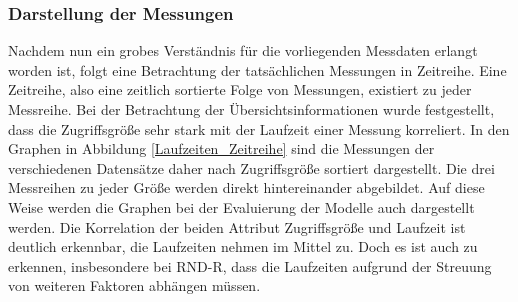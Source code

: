 \documentclass[
	12pt,
	a4paper,
	BCOR10mm,
	DIV14,
	listof=totoc,
	bibliography=totoc,
	headsepline
]{scrreprt}
\begin{document}
\subsubsection{Darstellung der Messungen}
Nachdem nun ein grobes Verständnis für die vorliegenden Messdaten erlangt worden ist, folgt eine Betrachtung der tatsächlichen Messungen in Zeitreihe.
Eine Zeitreihe, also eine zeitlich sortierte Folge von Messungen, existiert zu jeder Messreihe.
Bei der Betrachtung der Übersichtsinformationen wurde festgestellt, dass die Zugriffsgröße sehr stark mit der Laufzeit einer Messung korreliert.
In den Graphen in Abbildung \ref{Laufzeiten_Zeitreihe} sind die Messungen der verschiedenen Datensätze daher nach Zugriffsgröße sortiert dargestellt. Die drei Messreihen zu jeder Größe werden direkt hintereinander abgebildet. Auf diese Weise werden die Graphen bei der Evaluierung der Modelle auch dargestellt werden.
Die Korrelation der beiden Attribut Zugriffsgröße und Laufzeit ist deutlich erkennbar, die Laufzeiten nehmen im Mittel zu. Doch es ist auch zu erkennen, insbesondere bei RND-R, dass die Laufzeiten aufgrund der Streuung von weiteren Faktoren abhängen müssen.\medskip
\end{document}
